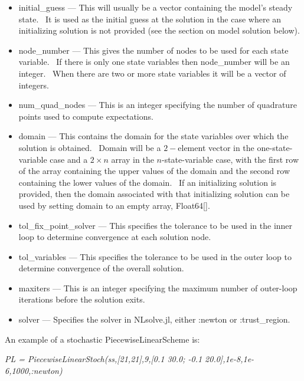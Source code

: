 \documentclass[notitlepage,11pt]{article}
\begin{document}
\begin{itemize}
\item initial\_guess --- This will usually be a vector containing the
model's steady state. \ It is used as the initial guess at the solution in
the case where an initializing solution is not provided (see the section on
model solution below).

\item node\_number --- This gives the number of nodes to be used for each
state variable. \ If there is only one state variables then node\_number
will be an integer. \ When there are two or more state variables it will be
a vector of integers.

\item num\_quad\_nodes --- This is an integer specifying the number of
quadrature points used to compute expectations.

\item domain --- This contains the domain for the state variables over which
the solution is obtained. \ Domain will be a $2-$element vector in the
one-state-variable case and a $2\times n$ array in the $n$-state-variable
case, with the first row of the array containing the upper values of the
domain and the second row containing the lower values of the domain. \ If an
initializing solution is provided, then the domain associated with that
initializing solution can be used by setting domain to an empty array,
Float64[].

\item tol\_fix\_point\_solver --- This specifies the tolerance to be used in
the inner loop to determine convergence at each solution node.

\item tol\_variables --- This specifies the tolerance to be used in the
outer loop to determine convergence of the overall solution.

\item maxiters --- This is an integer specifying the maximum number of
outer-loop iterations before the solution exits.

\item solver --- Specifies the solver in NLsolve.jl, either :newton or
:trust\_region.
\end{itemize}

\bigskip

An example of a stochastic PiecewiseLinearScheme is:

\bigskip

\textit{PL = PiecewiseLinearStoch(ss,[21,21],9,[0.1 30.0; -0.1
20.0],1e-8,1e-6,1000,:newton)}
\end{document}
